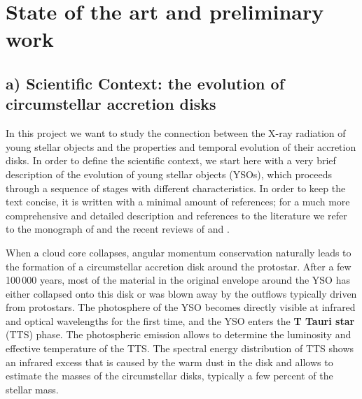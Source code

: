 \documentclass[10pt,fleqn,twoside]{article}
\newcommand{\Tcol}{\color{blue}}
\begin{document}
\section{\Tcol State of the art and preliminary work}
\renewcommand{\leftmark}{\sc State of the Art and preliminary work}


\subsection*{\Tcol a) Scientific Context: the evolution of circumstellar accretion disks}

In this project we want to study the connection between the X-ray radiation
of young stellar objects and the properties and temporal evolution of their
accretion disks.
%
In order to define the scientific context, we start here with a very brief description
of the evolution of young stellar objects (YSOs), which
proceeds through a sequence of stages with different characteristics.
In order to keep the text concise, it is written with a minimal amount of references;
for a much more comprehensive and detailed description and references to the
literature we refer to the monograph of \citet{Hartmann08} and the recent reviews of
\citet{Alexander14} and \citet{Hartmann16}.
\medskip

When a cloud core collapses, angular momentum conservation
naturally leads to the
formation of a circumstellar accretion disk around the
protostar.
%
After a few 100\,000 years, 
most of the material in the original envelope around the YSO 
has either collapsed
onto this disk or was blown away by the outflows typically driven from
protostars. The photosphere of the YSO becomes directly visible at
infrared and optical wavelengths for the first time, and the YSO
enters the \textbf{T Tauri star}
(TTS) phase. The photospheric emission allows to
determine the luminosity and effective temperature of the TTS.
The spectral energy distribution of TTS shows an infrared excess that is
caused by the warm dust in the disk and allows
to estimate the  masses of the circumstellar disks,
typically a few percent of the stellar mass.
 
\end{document}

